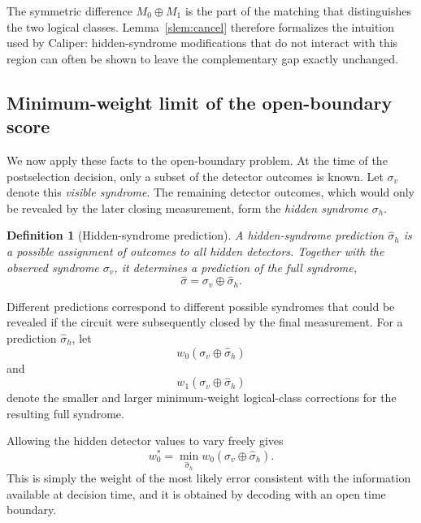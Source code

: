 \documentclass[
    reprint,
    amsmath,amssymb,
    nofootinbib,
    superscriptaddress,
    aps,
    noeprint,
    longbibliography,
    prl
]{revtex4-2}
\theoremstyle{plain}
\newtheorem{definition}[theorem]{Definition}
\begin{document}
The symmetric difference $M_0\oplus M_1$ is the part of the matching that distinguishes the two
logical classes. Lemma~\ref{slem:cancel} therefore formalizes the intuition used by Caliper:
hidden-syndrome modifications that do not interact with this region can often be shown to leave the
complementary gap exactly unchanged.

\subsection{Minimum-weight limit of the open-boundary score}

We now apply these facts to the open-boundary problem. At the time of the postselection decision,
only a subset of the detector outcomes is known. Let $\sigma_v$ denote this \emph{visible syndrome}.
The remaining detector outcomes, which would only be revealed by the later closing measurement, form
the \emph{hidden syndrome} $\sigma_h$.

\begin{definition}[Hidden-syndrome prediction]
    A \emph{hidden-syndrome prediction} $\hat\sigma_h$ is a possible assignment of outcomes to all
    hidden detectors. Together with the observed syndrome $\sigma_v$, it determines a prediction
    of the full syndrome,
    \begin{equation}
        \hat\sigma=\sigma_v\oplus\hat\sigma_h.
    \end{equation}
\end{definition}

Different predictions correspond to different possible syndromes that could be revealed if the
circuit were subsequently closed by the final measurement. For a prediction $\hat\sigma_h$, let
\begin{equation}
    w_0(\sigma_v\oplus\hat\sigma_h)
\end{equation}
and
\begin{equation}
    w_1(\sigma_v\oplus\hat\sigma_h)
\end{equation}
denote the smaller and larger minimum-weight logical-class corrections for the resulting full
syndrome.

Allowing the hidden detector values to vary freely gives
\begin{equation}
    w_0^*
    =
    \min_{\hat\sigma_h}
    w_0(\sigma_v\oplus\hat\sigma_h).
    \label{seq:omega-prime}
\end{equation}
This is simply the weight of the most likely error consistent with the information available at
decision time, and it is obtained by decoding with an open time boundary.
\end{document}
